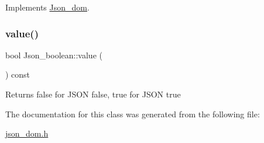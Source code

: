Implements \mbox{\hyperlink{classJson__dom_aed953eca1e112aade66511ad1bbf82b8}{Json\+\_\+dom}}.

\mbox{\label{classJson__boolean_a166bd3e20239ed1506982a1f072fbc37}} 
\subsubsection{\texorpdfstring{value()}{value()}}
{\footnotesize\ttfamily bool Json\+\_\+boolean\+::value (\begin{DoxyParamCaption}{ }\end{DoxyParamCaption}) const\hspace{0.3cm}{\ttfamily [inline]}}

\begin{DoxyReturn}{Returns}
false for J\+S\+ON false, true for J\+S\+ON true 
\end{DoxyReturn}


The documentation for this class was generated from the following file\+:\begin{DoxyCompactItemize}
\item 
\mbox{\hyperlink{json__dom_8h}{json\+\_\+dom.\+h}}\end{DoxyCompactItemize}

